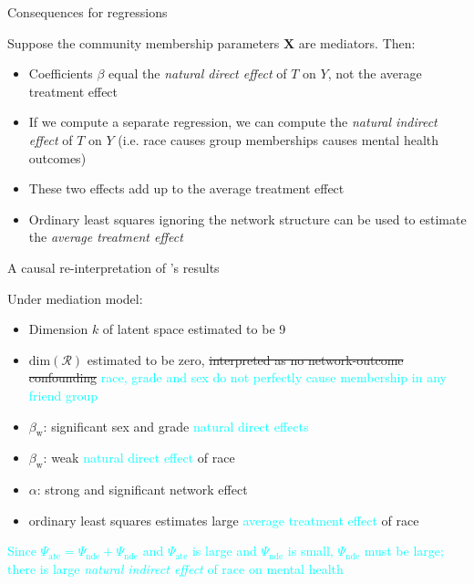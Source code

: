 \documentclass{beamer}
\theoremstyle{remark}
\newcommand{\X}{\bm X}
\begin{document}
\begin{frame}{Consequences for regressions}

    Suppose the community membership parameters $\X$ are mediators. Then:

    \begin{itemize}
        \item Coefficients $\beta$ equal the \emph{natural direct effect} of $T$ on $Y$, not the average treatment effect
        \item If we compute a separate regression, we can compute the \emph{natural indirect effect} of $T$ on $Y$ (i.e. race causes group memberships causes mental health outcomes)
        \item These two effects add up to the average treatment effect
        \item Ordinary least squares ignoring the network structure can be used to estimate the \emph{average treatment effect}
    \end{itemize}

\end{frame}

\begin{frame}{A causal re-interpretation of \cite{le_linear_2021}'s results}

    Under mediation model:

    \begin{itemize}
        \item Dimension $k$ of latent space estimated to be 9
        \item $\mathrm{dim}(\mathcal R)$ estimated to be zero, \sout{interpreted as no network-outcome confounding} \textcolor{cyan}{race, grade and sex do not perfectly cause membership in any friend group}
        \item $\beta_\text{w}$: significant sex and grade \textcolor{cyan}{natural direct effects}
        \item $\beta_\text{w}$: weak \textcolor{cyan}{natural direct effect} of race
        \item $\alpha$: strong and significant network effect
        \item ordinary least squares estimates large \textcolor{cyan}{average treatment effect} of race
    \end{itemize}

    \textcolor{cyan}{Since $\Psi_\text{ate} = \Psi_\text{nde} + \Psi_\text{nde}$ and $\Psi_\text{ate}$ is large and $\Psi_\text{nde}$ is small, $\Psi_\text{nde}$ must be large; there is large \emph{natural indirect effect} of race on mental health}

\end{frame}
\end{document}
